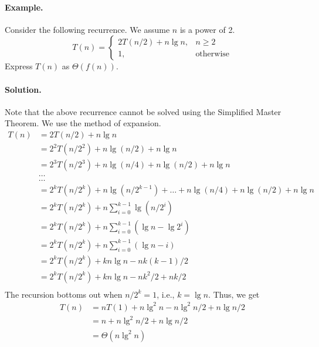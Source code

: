 \documentclass[11pt,twoside]{article}
\begin{document}
\paragraph{Example.} 
Consider the following recurrence. We assume $n$ is a
power of 2. 
\[
T(n) = \left\{ \begin{array}{ll}
      2T(n/2) + n\lg n, &  n \geq 2 \\
      1, & \mbox{otherwise}
      \end{array} \right.
\]
Express $T(n)$ as $\Theta(f(n))$. 
\paragraph{Solution.} Note that the above recurrence cannot be solved using the Simplified Master Theorem. We use the method of expansion.
\begin{align*}
T(n) & =  2T(n/2) + n\lg n \\
& =  2^2T(n/2^2) + n\lg (n/2) + n\lg n \\
& = 2^3T(n/2^3) + n\lg (n/4) +n\lg (n/2) + n\lg n \\
&  \ldots \\
&  \ldots \\
& = 2^kT(n/2^k) + n\lg (n/2^{k-1}) +\ldots + n\lg (n/4) + n\lg (n/2) + n\lg n \\ 
& = 2^kT(n/2^k) + n\sum_{i=0}^{k-1}\lg (n/2^i)\\
& = 2^kT(n/2^k) + n\sum_{i=0}^{k-1}(\lg n - \lg 2^i)\\
& = 2^kT(n/2^k) + n\sum_{i=0}^{k-1}(\lg n - i)\\
& = 2^kT(n/2^k) + kn\lg n - nk(k-1)/2\\
& = 2^kT(n/2^k) + kn\lg n -nk^2/2 + nk/2\\
\end{align*}
\noindent
The recursion bottoms out when $n/2^k = 1$, i.e., $k=\lg n$. Thus, we get
\begin{align*}
T(n) & =  nT(1) + n\lg^2 n - n\lg^2 n/2 + n\lg n/2 \\
     & =  n + n\lg^2n/2 + n\lg n/2\\
     & =  \Theta(n\lg^2n)
\end{align*}
\end{document}
